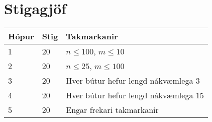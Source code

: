 \section*{Stigagjöf}
\begin{tabular}{|l|l|l|}
\hline
Hópur & Stig & Takmarkanir \\ \hline
1     & 20   & $n\leq 100$, $m\leq 10$ \\ \hline
2     & 20   & $n\leq 25$, $m\leq 100$ \\ \hline
3     & 20   & Hver bútur hefur lengd nákvæmlega $3$ \\ \hline
4     & 20   & Hver bútur hefur lengd nákvæmlega $15$ \\ \hline
5     & 20   & Engar frekari takmarkanir\\ \hline
\end{tabular}

